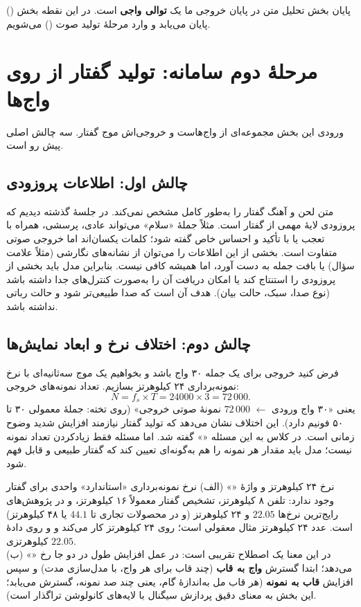 \begin{exambox}{پایان بخش تحلیل متن}
در پایان  خروجی ما یک \textbf{توالی واجی} است. در این نقطه بخش  () پایان می‌یابد و وارد مرحلهٔ تولید صوت () می‌شویم.
\end{exambox}

\section{مرحلهٔ دوم سامانه: تولید گفتار از روی واج‌ها}

ورودی این بخش مجموعه‌ای از واج‌هاست و خروجی‌اش موج گفتار. سه چالش اصلی پیش رو است.

\subsection{چالش اول: اطلاعات پروزودی}
متن لحن و آهنگ گفتار را به‌طور کامل مشخص نمی‌کند. در جلسهٔ گذشته دیدیم که پروزودی لایهٔ مهمی از گفتار است. مثلاً جملهٔ «سلام» می‌تواند عادی، پرسشی، همراه با تعجب یا با تأکید و احساس خاص گفته شود؛ کلمات یکسان‌اند اما خروجی صوتی متفاوت است. بخشی از این اطلاعات را می‌توان از نشانه‌های نگارشی (مثلاً علامت سؤال) یا بافت جمله به دست آورد، اما همیشه کافی نیست. بنابراین مدل باید بخشی از پروزودی را استنتاج کند یا امکان دریافت آن را به‌صورت کنترل‌های جدا داشته باشد (نوع صدا، سبک، حالت بیان). هدف آن است که صدا طبیعی‌تر شود و حالت رباتی نداشته باشد.

\subsection{چالش دوم: اختلاف نرخ و ابعاد نمایش‌ها}
فرض کنید خروجی  برای یک جمله ۳۰ واج باشد و بخواهیم یک موج سه‌ثانیه‌ای با نرخ نمونه‌برداری ۲۴ کیلوهرتز بسازیم. تعداد نمونه‌های خروجی:
\[
N = f_s \times T = 24000 \times 3 = 72\,000 .
\]
یعنی «۳۰ واج ورودی $\leftarrow$ $72\,000$ نمونهٔ صوتی خروجی» (روی تخته: جملهٔ معمولی ۳۰ تا ۵۰ فونیم دارد). این اختلاف نشان می‌دهد که تولید گفتار نیازمند افزایش شدید وضوح زمانی است. در کلاس به این مسئله «» گفته شد. اما مسئله فقط زیادکردن تعداد نمونه نیست؛ مدل باید مقدار هر نمونه را هم به‌گونه‌ای تعیین کند که گفتار طبیعی و قابل فهم شود.

\begin{correctionbox}{نرخ ۲۴ کیلوهرتز و واژهٔ «»}
(الف) نرخ نمونه‌برداری «استاندارد» واحدی برای گفتار وجود ندارد: تلفن ۸ کیلوهرتز، تشخیص گفتار معمولاً ۱۶ کیلوهرتز، و در پژوهش‌های  رایج‌ترین نرخ‌ها $22.05$ و ۲۴ کیلوهرتز (و در محصولات تجاری تا $44.1$ یا ۴۸ کیلوهرتز) است. عدد ۲۴ کیلوهرتز مثال معقولی است؛  روی ۲۴ کیلوهرتز کار می‌کند و  و  روی دادهٔ $22.05$ کیلوهرتزی. \\
(ب) «» در این معنا یک اصطلاح تقریبی است: در عمل افزایش طول در دو جا رخ می‌دهد؛ ابتدا گسترش \textbf{واج به قاب} (چند قاب برای هر واج، با مدل‌سازی مدت) و سپس افزایش \textbf{قاب به نمونه} (هر قاب مل به‌اندازهٔ گام، یعنی چند صد نمونه، گسترش می‌یابد؛ این بخش  به معنای دقیق پردازش سیگنال با لایه‌های کانولوشن تراگذار است).
\end{correctionbox}

